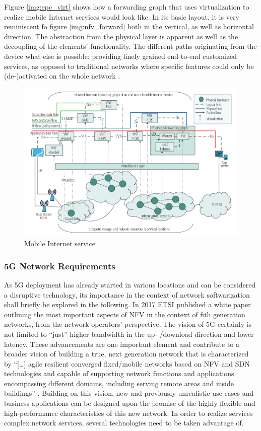 Figure \ref{img:epc_virt} shows how a forwarding graph that uses virtualization to realize mobile Internet services would look like. In its basic layout, it is very reminiscent fo figure \ref{img:nfv_forward} both in the vertical, as well as horizontal direction. The abstraction from the physical layer is apparent as well as the decoupling of the elements' functionality. The different paths originating from the device what else is possible: providing finely grained end-to-end customized services, as opposed to traditional networks where specific features could only be (de-)activated on the whole network  \cite{abdelwahab2016network}.

\begin{figure}[h]
	\includegraphics[width=1\linewidth]{images/mobileInternetServices.png}
	\caption{Mobile Internet service \cite{abdelwahab2016network}}
	\label{img:mobile}
\end{figure}



\subsubsection{5G Network Requirements}
As 5G deployment has already started in various locations and can be considered a disruptive technology, its importance in the context of network softwarization shall briefly be explored in the following. In 2017 ETSI published a white paper outlining the most important aspects of NFV in the context of fith generation networks, from the network operators' perspective. The vision of 5G certainly is not limited to ``just'' higher bandwidth in the up- /download  direction and lower latency. These advancements are one important element and contribute to a broader vision of  building a true, next generation network that is characterized by ``[\dots] agile resilient converged fixed/mobile networks based on NFV and SDN technologies and capable of supporting network functions and applications encompassing different domains, including serving remote areas and inside buildings'' \cite{nfv5g}. Building on this vision, new and previously unrealistic use cases and business applications can be designed upon the promise of the highly flexible and high-performance characteristics of this new network. In order to realize services complex network services, several technologies need to be taken advantage of. 

